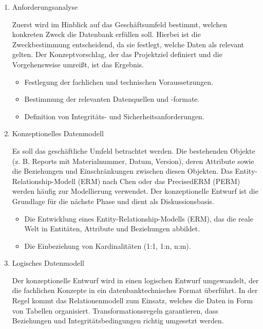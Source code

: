 \begin{enumerate}

\item
Anforderungsanalyse

Zuerst wird im Hinblick auf das Geschäftsumfeld bestimmt, welchen konkreten Zweck die Datenbank erfüllen soll.
Hierbei ist die Zweckbestimmung entscheidend, da sie festlegt, welche Daten als relevant gelten.
Der Konzeptvorschlag, der das Projektziel definiert und die Vorgehensweise umreißt, ist das Ergebnis.
\begin{itemize}

\item
Festlegung der fachlichen und technischen Voraussetzungen.
\item
Bestimmung der relevanten Datenquellen und -formate.
\item
Definition von Integritäts- und Sicherheitsanforderungen.

\end{itemize}

\item
Konzeptionelles Datenmodell

Es soll das geschäftliche Umfeld betrachtet werden.
Die bestehenden Objekte (z. B. Reports mit Materialnummer, Datum, Version), deren Attribute sowie die Beziehungen und Einschränkungen zwischen diesen Objekten.
Das Entity-Relationship-Modell (ERM) nach Chen oder das PrecisedERM (PERM) werden häufig zur Modellierung verwendet.
Der konzeptionelle Entwurf ist die Grundlage für die nächste Phase und dient als Diskussionsbasis.
\begin{itemize}

\item Die Entwicklung eines Entity-Relationship-Modells (ERM), das die reale Welt in Entitäten, Attribute und Beziehungen abbildet.
\item Die Einbeziehung von Kardinalitäten (1:1, 1:n, n:m).

\end{itemize}

\item
Logisches Datenmodell

Der konzeptionelle Entwurf wird in einen logischen Entwurf umgewandelt, der die fachlichen Konzepte in ein datenbanktechnisches Format überführt.
In der Regel kommt das Relationenmodell zum Einsatz, welches die Daten in Form von Tabellen organisiert.
Transformationsregeln garantieren, dass Beziehungen und Integritätsbedingungen richtig umgesetzt werden.
\begin{itemize}


\end{itemize}
\end{enumerate}
